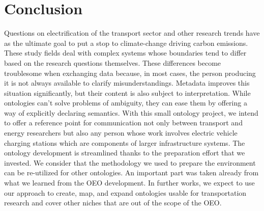 ﻿\section{Conclusion}
\label{conclusion}

Questions on electrification of the transport sector and other research trends
have as the ultimate goal to put a stop to climate-change driving carbon
emissions. These study fields deal with complex systems whose boundaries tend to
differ based on the research questions themselves. These differences become
troublesome when exchanging data because, in most cases, the person producing it
is not always available to clarify misunderstandings. Metadata improves this
situation significantly, but their content is also subject to interpretation.
While ontologies can't solve problems of ambiguity, they can ease them by
offering a way of explicitly declaring semantics. With this small ontology
project, we intend to offer a reference point for communication not only between
transport and energy researchers but also any person whose work involves
electric vehicle charging stations which are components of larger infrastructure
systems. The ontology development is streamlined thanks to the preparation
effort that we invested. We consider that the methodology we used to prepare the
environment can be re-utilized for other ontologies. An important part was taken
already from what we learned from the OEO development. In further works, we
expect to use our approach to create, map, and expand ontologies usable for
transportation research and cover other niches that are out of the scope of the
OEO.